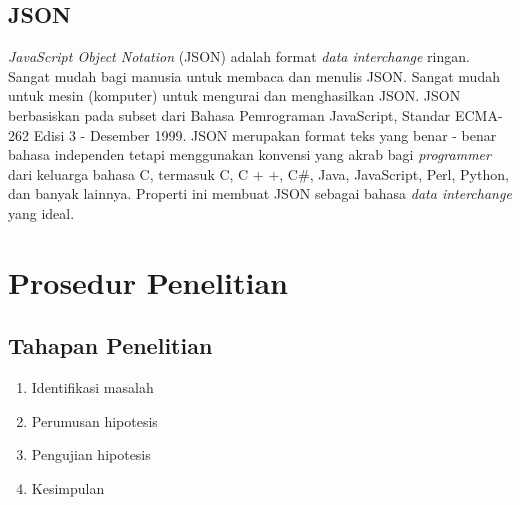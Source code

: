 \documentclass[a4paper, 12pt]{report}
\begin{document}
\subsection*{JSON}
\onehalfspacing \textit{JavaScript Object Notation} (JSON) adalah format \textit{data interchange} ringan. Sangat mudah bagi manusia untuk membaca dan menulis JSON. Sangat mudah untuk mesin (komputer) untuk mengurai dan menghasilkan JSON. JSON berbasiskan pada subset dari Bahasa Pemrograman JavaScript, Standar ECMA-262 Edisi 3 - Desember 1999. JSON merupakan format teks yang benar - benar bahasa independen tetapi menggunakan konvensi yang akrab bagi \textit{programmer} dari keluarga bahasa C, termasuk C, C + +, C\#, Java, JavaScript, Perl, Python, dan banyak lainnya. Properti ini membuat JSON sebagai bahasa \textit{data interchange} yang ideal\cite{introducing-json}.

\section*{Prosedur Penelitian}

\subsection*{Tahapan Penelitian}

\begin{enumerate}
  \item Identifikasi masalah
  \item Perumusan hipotesis
  \item Pengujian hipotesis
  \item Kesimpulan
\end{enumerate}
\end{document}

